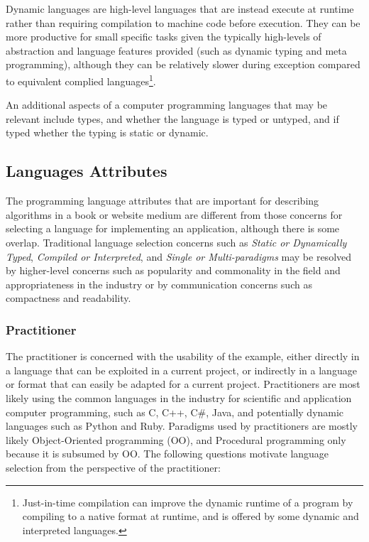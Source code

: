 \documentclass[a4paper, 11pt]{article}
\begin{document}
Dynamic languages are high-level languages that are instead execute at runtime rather than requiring compilation to machine code before execution. They can be more productive for small specific tasks given the typically high-levels of abstraction and language features provided (such as dynamic typing and meta programming), although they can be relatively slower during exception compared to equivalent complied languages\footnote{Just-in-time compilation can improve the dynamic runtime of a program by compiling to a native format at runtime, and is offered by some dynamic and interpreted languages.}.

An additional aspects of a computer programming languages that may be relevant include types, and whether the language is typed or untyped, and if typed whether the typing is static or dynamic.

% 
%
\subsection{Languages Attributes}
The programming language attributes that are important for describing algorithms in a book or website medium are different from those concerns for selecting a language for implementing an application, although there is some overlap.
Traditional language selection concerns such as \emph{Static or Dynamically Typed}, \emph{Compiled or Interpreted}, and \emph{Single or Multi-paradigms} may be resolved by higher-level concerns such as popularity and commonality in the field and appropriateness in the industry or by communication concerns such as compactness and readability.

\subsubsection{Practitioner}
The practitioner is concerned with the usability of the example, either directly in a language that can be exploited in a current project, or indirectly in a language or format that can easily be adapted for a current project.
Practitioners are most likely using the common languages in the industry for scientific and application computer programming, such as C, C++, C\#, Java, and potentially dynamic languages such as Python and Ruby. Paradigms used by practitioners are mostly likely Object-Oriented programming (OO), and Procedural programming only because it is subsumed by OO.
The following questions motivate language selection from the perspective of the practitioner:
\end{document}
